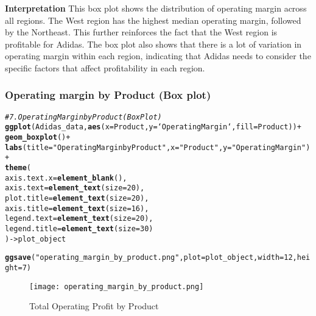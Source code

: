 \documentclass{article}\usepackage[]{graphicx}\usepackage[]{xcolor}
\makeatletter
\newcommand{\hlnum}[1]{\textcolor[rgb]{0.686,0.059,0.569}{#1}}%
\newcommand{\hlsng}[1]{\textcolor[rgb]{0.192,0.494,0.8}{#1}}%
\newcommand{\hlcom}[1]{\textcolor[rgb]{0.678,0.584,0.686}{\textit{#1}}}%
\newcommand{\hlopt}[1]{\textcolor[rgb]{0,0,0}{#1}}%
\newcommand{\hldef}[1]{\textcolor[rgb]{0.345,0.345,0.345}{#1}}%
\newcommand{\hlkwb}[1]{\textcolor[rgb]{0.69,0.353,0.396}{#1}}%
\newcommand{\hlkwc}[1]{\textcolor[rgb]{0.333,0.667,0.333}{#1}}%
\newcommand{\hlkwd}[1]{\textcolor[rgb]{0.737,0.353,0.396}{\textbf{#1}}}%
\newenvironment{kframe}{%
 \def\at@end@of@kframe{}%
 \ifinner\ifhmode%
  \def\at@end@of@kframe{\end{minipage}}%
  \begin{minipage}{\columnwidth}%
 \fi\fi%
 \def\FrameCommand##1{\hskip\@totalleftmargin \hskip-\fboxsep
 \colorbox{shadecolor}{##1}\hskip-\fboxsep
     \hskip-\linewidth \hskip-\@totalleftmargin \hskip\columnwidth}%
 \MakeFramed {\advance\hsize-\width
   \@totalleftmargin\z@ \linewidth\hsize
   \@setminipage}}%
 {\par\unskip\endMakeFramed%
 \at@end@of@kframe}
\newenvironment{knitrout}{}{} %
\makeatother
\begin{document}
\textbf{Interpretation} This box plot shows the distribution of operating margin across all regions. The West region has the highest median operating margin, followed by the Northeast. This further reinforces the fact that the West region is profitable for Adidas. The box plot also shows that there is a lot of variation in operating margin within each region, indicating that Adidas needs to consider the specific factors that affect profitability in each region.


\subsubsection{Operating margin by Product (Box plot)}

\begin{knitrout}
\color{fgcolor}\begin{kframe}
\begin{alltt}
\hlcom{# 7. Operating Margin by Product (Box Plot)}
\hlkwd{ggplot}\hldef{(Adidas_data,} \hlkwd{aes}\hldef{(}\hlkwc{x} \hldef{= Product,} \hlkwc{y} \hldef{= `Operating Margin`,} \hlkwc{fill} \hldef{= Product))} \hlopt{+}
  \hlkwd{geom_boxplot}\hldef{()} \hlopt{+}
  \hlkwd{labs}\hldef{(}\hlkwc{title} \hldef{=} \hlsng{"Operating Margin by Product"}\hldef{,} \hlkwc{x} \hldef{=} \hlsng{"Product"}\hldef{,} \hlkwc{y} \hldef{=} \hlsng{"Operating Margin"}\hldef{)} \hlopt{+}
  \hlkwd{theme}\hldef{(}
    \hlkwc{axis.text.x} \hldef{=} \hlkwd{element_blank}\hldef{(),}
    \hlkwc{axis.text} \hldef{=} \hlkwd{element_text}\hldef{(}\hlkwc{size} \hldef{=} \hlnum{20}\hldef{),}
    \hlkwc{plot.title} \hldef{=} \hlkwd{element_text}\hldef{(}\hlkwc{size} \hldef{=} \hlnum{20}\hldef{),}
    \hlkwc{axis.title} \hldef{=} \hlkwd{element_text}\hldef{(}\hlkwc{size} \hldef{=} \hlnum{16}\hldef{),}
    \hlkwc{legend.text} \hldef{=} \hlkwd{element_text}\hldef{(}\hlkwc{size} \hldef{=} \hlnum{20}\hldef{),}
    \hlkwc{legend.title} \hldef{=} \hlkwd{element_text}\hldef{(}\hlkwc{size} \hldef{=} \hlnum{30}\hldef{)}
  \hldef{)} \hlkwb{->} \hldef{plot_object}

\hlkwd{ggsave}\hldef{(}\hlsng{"operating_margin_by_product.png"}\hldef{,} \hlkwc{plot} \hldef{= plot_object,} \hlkwc{width} \hldef{=} \hlnum{12}\hldef{,} \hlkwc{height} \hldef{=} \hlnum{7}\hldef{)}
\end{alltt}
\end{kframe}
\end{knitrout}

\begin{figure}[htbp]
\centering
\texttt{[image: operating\_margin\_by\_product.png]}
\caption{Total Operating Profit by Product}
\label{fig:operating_margin_by_product}
\end{figure}
\end{document}
